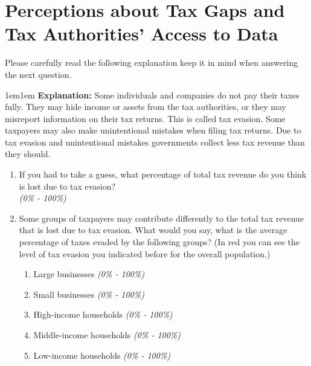 \documentclass[11pt]{article}
\begin{document}
\section*{Perceptions about Tax Gaps and Tax Authorities' Access to Data}
\noindent Please carefully read the following explanation keep it in mind when answering the next question. \\
\begin{adjustwidth}{1em}{1em} \textbf{Explanation:} Some individuals and companies do not pay their taxes fully. They may hide income or assets from the tax authorities, or they may misreport information on their tax returns. This is called tax evasion. Some taxpayers may also make unintentional mistakes when filing tax returns. Due to tax evasion and unintentional mistakes governments collect less tax revenue than they should. 
\end{adjustwidth}
\begin{enumerate}[resume]
    \item If you had to take a guess, what percentage of total tax revenue do you think is lost due to tax evasion? \\
    \textit{(0\% - 100\%)}
    \item Some groups of taxpayers may contribute differently to the total tax revenue that is lost due to tax evasion. What would you say, what is the average percentage of taxes evaded by the following groups? (In red you can see the level of tax evasion you indicated before for the overall population.)
    \begin{enumerate}[label=\alph*)]
        \item Large businesses \textit{(0\% - 100\%)}
        \item Small businesses \textit{(0\% - 100\%)}
        \item High-income households \textit{(0\% - 100\%)}
        \item Middle-income households \textit{(0\% - 100\%)}
        \item Low-income households \textit{(0\% - 100\%)}
    \end{enumerate}
\end{enumerate}
\end{document}
